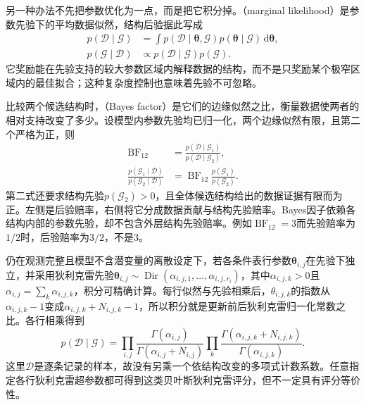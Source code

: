 另一种办法不先把参数优化为一点，而是把它积分掉。（marginal likelihood）是参数先验下的平均数据似然，结构后验据此写成
\begin{equation}
  \begin{aligned}
    p(\mathcal{D}\mid\mathcal{G})
      &=\int p(\mathcal{D}\mid\bm{\theta},\mathcal{G})
              p(\bm{\theta}\mid\mathcal{G})\,\mathrm{d}\bm{\theta},\\
    p(\mathcal{G}\mid\mathcal{D})
      &\propto p(\mathcal{D}\mid\mathcal{G})p(\mathcal{G}).
  \end{aligned}
  \label{eq:pgm-structure-learning-posterior}
\end{equation}
它奖励能在先验支持的较大参数区域内解释数据的结构，而不是只奖励某个极窄区域内的最佳拟合；这种复杂度控制也意味着先验不可忽略。

比较两个候选结构时，（Bayes factor）是它们的边缘似然之比，衡量数据使两者的相对支持改变了多少。设模型内参数先验均已归一化，两个边缘似然有限，且第二个严格为正，则
\begin{equation}
  \begin{aligned}
    \operatorname{BF}_{12}
      &=\frac{p(\mathcal{D}\mid\mathcal{G}_1)}
              {p(\mathcal{D}\mid\mathcal{G}_2)},\\
    \frac{p(\mathcal{G}_1\mid\mathcal{D})}
         {p(\mathcal{G}_2\mid\mathcal{D})}
      &=\operatorname{BF}_{12}
        \frac{p(\mathcal{G}_1)}{p(\mathcal{G}_2)}.
  \end{aligned}
  \label{eq:pgm-structure-learning-bayes-factor}
\end{equation}
第二式还要求结构先验$p(\mathcal{G}_2)>0$，且全体候选结构给出的数据证据有限而为正。左侧是后验赔率，右侧将它分成数据贡献与结构先验赔率。Bayes因子依赖各结构内部的参数先验，却不包含外层结构先验赔率。例如$\operatorname{BF}_{12}=3$而先验赔率为$1/2$时，后验赔率为$3/2$，不是$3$。

仍在观测完整且模型不含潜变量的离散设定下，若各条件表行参数$\bm{\theta}_{i,j}$在先验下独立，并采用狄利克雷先验$\bm{\theta}_{i,j}\sim\operatorname{Dir}(\alpha_{i,j,1},\ldots,\alpha_{i,j,r_i})$，其中$\alpha_{i,j,k}>0$且$\alpha_{i,j}=\sum_k\alpha_{i,j,k}$，积分可精确计算。每行似然与先验相乘后，$\theta_{i,j,k}$的指数从$\alpha_{i,j,k}-1$变成$\alpha_{i,j,k}+N_{i,j,k}-1$，所以积分就是更新前后狄利克雷归一化常数之比。各行相乘得到
\begin{equation}
  p(\mathcal{D}\mid\mathcal{G})
  =\prod_{i,j}
    \frac{\Gamma(\alpha_{i,j})}
         {\Gamma(\alpha_{i,j}+N_{i,j})}
    \prod_k
    \frac{\Gamma(\alpha_{i,j,k}+N_{i,j,k})}
         {\Gamma(\alpha_{i,j,k})}.
  \label{eq:pgm-structure-learning-dirichlet}
\end{equation}
这里$\mathcal{D}$是逐条记录的样本，故没有另乘一个依结构改变的多项式计数系数。任意指定各行狄利克雷超参数都可得到这类贝叶斯狄利克雷评分，但不一定具有评分等价性。


